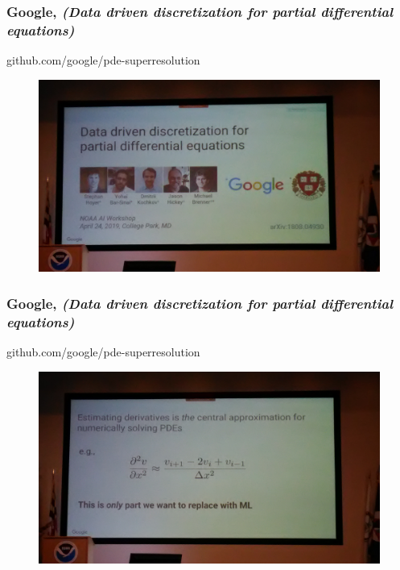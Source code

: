 \documentclass{beamer}
\begin{document}
\begin{frame}
\frametitle{Google, \textit{(Data driven discretization for partial differential equations)}}
github.com/google/pde-superresolution
\begin{figure}
	\includegraphics[width=.9\linewidth]{figs/P_20190424_153531.jpg}
\end{figure}
\end{frame}

\begin{frame}
\frametitle{Google, \textit{(Data driven discretization for partial differential equations)}}
github.com/google/pde-superresolution
\begin{figure}
	\includegraphics[width=.9\linewidth]{figs/P_20190424_154437.jpg}
\end{figure}
\end{frame}
\end{document}
